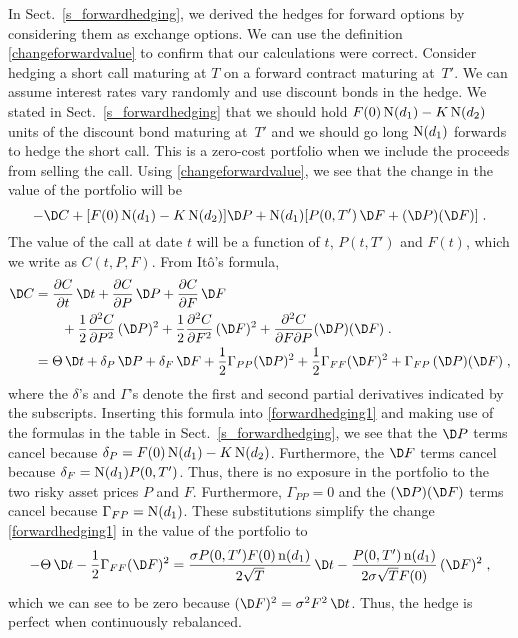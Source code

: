 In Sect.~\ref{s_forwardhedging}, we derived the hedges for forward options by considering them as exchange options.  We can use the definition \eqref{changeforwardvalue} to confirm that our calculations were correct.  Consider hedging a short call maturing at $T$ on a forward contract maturing at~$T'$.  We can assume interest rates vary randomly and use discount bonds in the hedge.  We stated in Sect.~\ref{s_forwardhedging} that we  should hold 
$F(0)\operatorname{N}(d_1)-K\operatorname{N}(d_2)$
units of the discount bond maturing at~$T'$  and we should go long 
$\operatorname{N}(d_1)$ forwards to hedge the short call. 
This is a zero-cost portfolio when we include the proceeds from selling the call.  Using \eqref{changeforwardvalue}, we see that the change in the value of the portfolio will be
\begin{equation}\label{forwardhedging1}
-\D C + [F(0)\N(d_1)-K\N(d_2)]\D P + \N(d_1)[P(0,T')\,\D F + (\D P)(\D F)]\;.
\end{equation}
The value of the call at date $t$ will be a function of $t$,  $P(t,T')$ and $F(t)$, which we write as $C(t,P,F)$.  From It\^o's formula,
\begin{align*}
\D C &= \frac{\partial C}{\partial t}\,\D t + \frac{\partial C}{\partial P}\,\D P + \frac{\partial C}{\partial F}\,\D F \\  &\qquad + \frac{1}{2}\frac{\partial^2 C}{\partial P^2}\, (\D P)^2   + \frac{1}{2}\frac{\partial^2 C}{\partial F^2}\, (\D F)^2 + \frac{\partial^2 C}{\partial F \partial P} (\D P)(\D F)\;.\\
&=\Theta\,\D t + \delta_P\,\D P + \delta_F\,\D F  + \frac{1}{2}\Gamma_{PP} (\D P)^2 + \frac{1}{2}\Gamma_{FF} (\D F)^2  + \Gamma_{FP}\,(\D P)(\D F)\;,
\end{align*}
where the $\delta$'s and $\Gamma$'s denote the first and second partial derivatives indicated by the subscripts.  Inserting this formula into \eqref{forwardhedging1} and making use of the formulas in the table in Sect.~\ref{s_forwardhedging}, we see that the $\D P$ terms cancel because $\delta_P = F(0)\operatorname{N}(d_1)-K\operatorname{N}(d_2)$.  Furthermore, the $\D F$ terms cancel because $\delta_F = \operatorname{N}(d_1)P(0,T')$.  Thus, there is no exposure in the portfolio to the two risky asset prices $P$ and $F$.  Furthermore, $\Gamma_{PP} = 0$ and the $(\D P)(\D F)$ terms cancel because $\Gamma_{FP} = \operatorname{N}(d_1)$.  These substitutions simplify the change \eqref{forwardhedging1} in the value of the portfolio to
$$-\Theta\,\D t - \frac{1}{2}\Gamma_{FF} (\D F)^2  = \frac{\sigma P(0,T')F(0)\nd(d_1)}{2\sqrt{T}}\,\D t  -  \frac{P(0,T')\nd(d_1)}{2\sigma\sqrt{T}F(0)}\,(\D F)^2\; ,$$
which we can see to be zero because $(\D F)^2 = \sigma^2F^2\,\D t$.
Thus, the hedge is perfect when continuously rebalanced.

